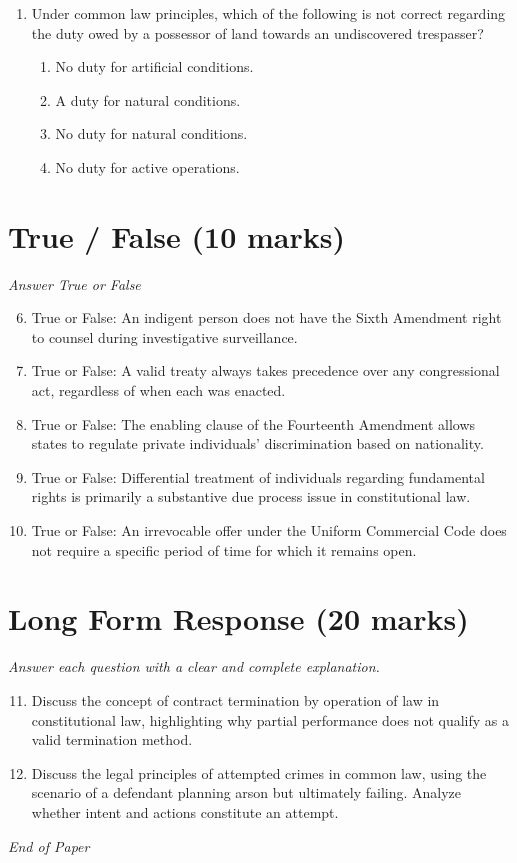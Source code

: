 \documentclass[12pt]{article}
\begin{document}
\begin{enumerate}[label=\arabic*.]
\begin{enumerate}[label=(\alph*)]
    \item Privacy
    \item Alienage
\end{enumerate}
\item Under common law principles, which of the following is not correct regarding the duty owed by a possessor of land towards an undiscovered trespasser?
\begin{enumerate}[label=(\alph*)]
    \item No duty for artificial conditions.
    \item A duty for natural conditions.
    \item No duty for natural conditions.
    \item No duty for active operations.
\end{enumerate}
\end{enumerate}

\section*{True / False (10 marks)}
\textit{Answer True or False}
\begin{enumerate}[label=\arabic*.]
\setcounter{enumi}{5}
\item True or False: An indigent person does not have the Sixth Amendment right to counsel during investigative surveillance.
\item True or False: A valid treaty always takes precedence over any congressional act, regardless of when each was enacted.
\item True or False: The enabling clause of the Fourteenth Amendment allows states to regulate private individuals' discrimination based on nationality.
\item True or False: Differential treatment of individuals regarding fundamental rights is primarily a substantive due process issue in constitutional law.
\item True or False: An irrevocable offer under the Uniform Commercial Code does not require a specific period of time for which it remains open.
\end{enumerate}

\section*{Long Form Response (20 marks)}
\textit{Answer each question with a clear and complete explanation.}
\begin{enumerate}[label=\arabic*.]
\setcounter{enumi}{10}
\item Discuss the concept of contract termination by operation of law in constitutional law, highlighting why partial performance does not qualify as a valid termination method.
\item Discuss the legal principles of attempted crimes in common law, using the scenario of a defendant planning arson but ultimately failing. Analyze whether intent and actions constitute an attempt.
\end{enumerate}

\vfill
\noindent\textit{End of Paper}
\end{document}
